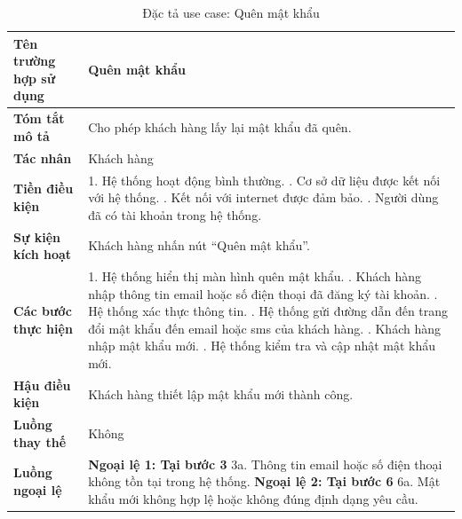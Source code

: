 {
\begin{longtable}{|>{\bfseries}p{4cm}|p{11.5cm}|}
\caption{Đặc tả use case: Quên mật khẩu}
\label{tab:uc-forgot-password} \\
\hline
\textbf{Tên trường hợp sử dụng} & Quên mật khẩu \\
\hline
\textbf{Tóm tắt mô tả} & Cho phép khách hàng lấy lại mật khẩu đã quên. \\
\hline
\textbf{Tác nhân} & Khách hàng\\
\hline
\textbf{Tiền điều kiện} & 1. Hệ thống hoạt động bình thường. \newline
2. Cơ sở dữ liệu được kết nối với hệ thống. \newline
3. Kết nối với internet được đảm bảo. \newline
4. Người dùng đã có tài khoản trong hệ thống. \\
\hline
\textbf{Sự kiện kích hoạt} & Khách hàng nhấn nút “Quên mật khẩu”. \\
\hline
\textbf{Các bước thực hiện} & 1. Hệ thống hiển thị màn hình quên mật khẩu. \newline
2. Khách hàng nhập thông tin email hoặc số điện thoại đã đăng ký tài khoản. \newline
3. Hệ thống xác thực thông tin. \newline
4. Hệ thống gửi đường dẫn đến trang đổi mật khẩu đến email hoặc sms của khách hàng. \newline
5. Khách hàng nhập mật khẩu mới. \newline
6. Hệ thống kiểm tra và cập nhật mật khẩu mới. \\
\hline
\textbf{Hậu điều kiện} & Khách hàng thiết lập mật khẩu mới thành công. \\
\hline
\textbf{Luồng thay thế} & Không \\
\hline
\textbf{Luồng ngoại lệ} & \textbf{Ngoại lệ 1: Tại bước 3} \newline
3a. Thông tin email hoặc số điện thoại không tồn tại trong hệ thống. \newline
\textbf{Ngoại lệ 2: Tại bước 6} \newline
6a. Mật khẩu mới không hợp lệ hoặc không đúng định dạng yêu cầu. \\
\hline
\end{longtable}

}
